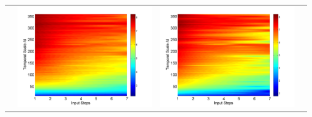 \documentclass[draft,wrr]{AGUTeX}
\begin{document}
\begin{article}
\begin{table}[H]
\begin{tabular}{cccc}
&\begin{minipage}{.3\textwidth}\includegraphics[width=\linewidth]{resultgraph/06810000p_abs.png}\end{minipage}
&\begin{minipage}{.3\textwidth}\includegraphics[width=\linewidth]{resultgraph/06810000pep_abs.png}\end{minipage}

\end{tabular}
\end{table}
\end{article}
\end{document}
